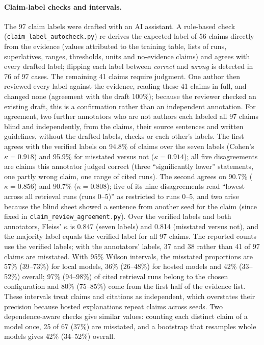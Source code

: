 \paragraph{Claim-label checks and intervals.}
The 97 claim labels were drafted with an AI assistant. A rule-based check (\texttt{claim\_label\_autocheck.py}) re-derives the expected label of 56 claims directly from the evidence (values attributed to the training table, lists of runs, superlatives, ranges, thresholds, units and no-evidence claims) and agrees with every drafted label; flipping each label between \emph{correct} and \emph{wrong} is detected in 76 of 97 cases. The remaining 41 claims require judgment. One author then reviewed every label against the evidence, reading these 41 claims in full, and changed none (agreement with the draft 100\%); because the reviewer checked an existing draft, this is a confirmation rather than an independent annotation. For agreement, two further annotators who are not authors each labeled all 97 claims blind and independently, from the claims, their source sentences and written guidelines, without the drafted labels, checks or each other's labels. The first agrees with the verified labels on 94.8\% of claims over the seven labels (Cohen's $\kappa=0.918$) and 95.9\% for misstated versus not ($\kappa=0.914$); all five disagreements are claims this annotator judged correct (three ``significantly lower'' statements, one partly wrong claim, one range of cited runs). The second agrees on 90.7\% ($\kappa=0.856$) and 90.7\% ($\kappa=0.808$); five of its nine disagreements read ``lowest across all retrieval runs (runs 0--5)'' as restricted to runs 0--5, and two arise because the blind sheet showed a sentence from another seed for the claim (since fixed in \texttt{claim\_review\_agreement.py}). Over the verified labels and both annotators, Fleiss' $\kappa$ is 0.847 (seven labels) and 0.814 (misstated versus not), and the majority label equals the verified label for all 97 claims. The reported counts use the verified labels; with the annotators' labels, 37 and 38 rather than 41 of 97 claims are misstated. With 95\% Wilson intervals, the misstated proportions are 57\% (39--73\%) for local models, 36\% (26--48\%) for hosted models and 42\% (33--52\%) overall; 97\% (94--98\%) of cited retrieval runs belong to the chosen configuration and 80\% (75--85\%) come from the first half of the evidence list. These intervals treat claims and citations as independent, which overstates their precision because hosted explanations repeat claims across seeds. Two dependence-aware checks give similar values: counting each distinct claim of a model once, 25 of 67 (37\%) are misstated, and a bootstrap that resamples whole models gives 42\% (34--52\%) overall.

